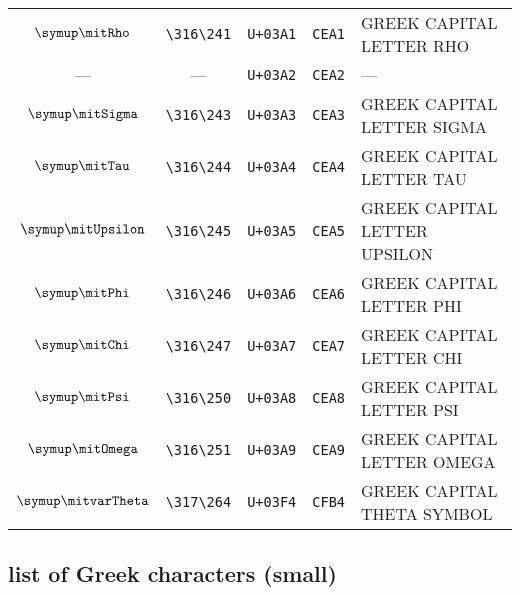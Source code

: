 \documentclass{ltjsarticle}
\begin{document}
\begin{table}[ht]
\begin{tabular}{|ccccl|}
					\( \symup\mitRho \)      & \verb|\316\241| & \verb|U+03A1| & \verb|CEA1| & GREEK CAPITAL LETTER RHO\\%
					---                      & ---             & \verb|U+03A2| & \verb|CEA2| & ---\\%
					\( \symup\mitSigma \)    & \verb|\316\243| & \verb|U+03A3| & \verb|CEA3| & GREEK CAPITAL LETTER SIGMA\\%
					\( \symup\mitTau \)      & \verb|\316\244| & \verb|U+03A4| & \verb|CEA4| & GREEK CAPITAL LETTER TAU\\%
					\( \symup\mitUpsilon \)  & \verb|\316\245| & \verb|U+03A5| & \verb|CEA5| & GREEK CAPITAL LETTER UPSILON\\%
					\( \symup\mitPhi \)      & \verb|\316\246| & \verb|U+03A6| & \verb|CEA6| & GREEK CAPITAL LETTER PHI\\%
					\( \symup\mitChi \)      & \verb|\316\247| & \verb|U+03A7| & \verb|CEA7| & GREEK CAPITAL LETTER CHI\\%
					\( \symup\mitPsi \)      & \verb|\316\250| & \verb|U+03A8| & \verb|CEA8| & GREEK CAPITAL LETTER PSI\\%
					\( \symup\mitOmega \)    & \verb|\316\251| & \verb|U+03A9| & \verb|CEA9| & GREEK CAPITAL LETTER OMEGA\\%
					\( \symup\mitvarTheta \) & \verb|\317\264| & \verb|U+03F4| & \verb|CFB4| & GREEK CAPITAL THETA SYMBOL\\\hline%
				\end{tabular}
			\end{table}
			\clearpage%

		\subsection{list of Greek characters (small)}
	
\end{document}
